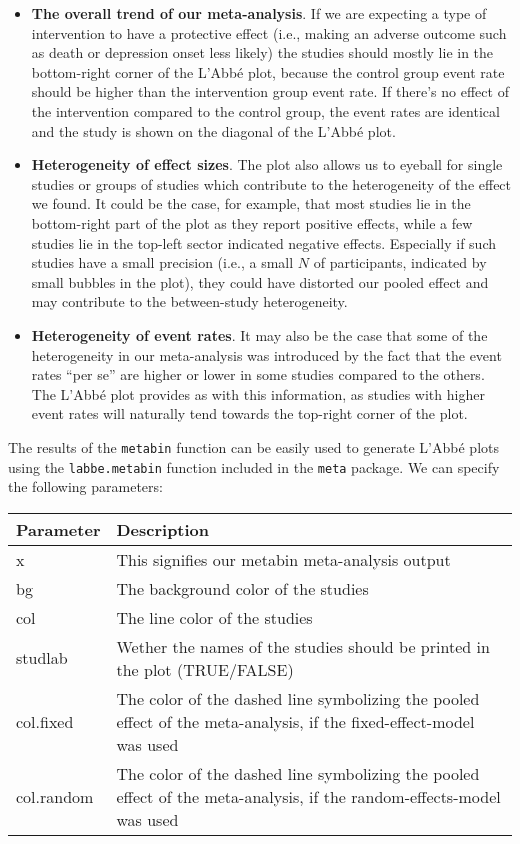 \documentclass[]{book}
\providecommand{\tightlist}{%
  \setlength{\itemsep}{0pt}\setlength{\parskip}{0pt}}
\theoremstyle{definition}
\theoremstyle{definition}
\theoremstyle{definition}
\theoremstyle{remark}
\begin{document}
\begin{itemize}
\tightlist
\item
  \textbf{The overall trend of our meta-analysis}. If we are expecting a
  type of intervention to have a protective effect (i.e., making an
  adverse outcome such as death or depression onset less likely) the
  studies should mostly lie in the bottom-right corner of the L'Abbé
  plot, because the control group event rate should be higher than the
  intervention group event rate. If there's no effect of the
  intervention compared to the control group, the event rates are
  identical and the study is shown on the diagonal of the L'Abbé plot.
\item
  \textbf{Heterogeneity of effect sizes}. The plot also allows us to
  eyeball for single studies or groups of studies which contribute to
  the heterogeneity of the effect we found. It could be the case, for
  example, that most studies lie in the bottom-right part of the plot as
  they report positive effects, while a few studies lie in the top-left
  sector indicated negative effects. Especially if such studies have a
  small precision (i.e., a small \(N\) of participants, indicated by
  small bubbles in the plot), they could have distorted our pooled
  effect and may contribute to the between-study heterogeneity.
\item
  \textbf{Heterogeneity of event rates}. It may also be the case that
  some of the heterogeneity in our meta-analysis was introduced by the
  fact that the event rates ``per se'' are higher or lower in some
  studies compared to the others. The L'Abbé plot provides as with this
  information, as studies with higher event rates will naturally tend
  towards the top-right corner of the plot.
\end{itemize}

The results of the \texttt{metabin} function can be easily used to
generate L'Abbé plots using the \texttt{labbe.metabin} function included
in the \texttt{meta} package. We can specify the following parameters:

\begin{tabular}{l|l}
\hline
Parameter & Description\\
\hline
x & This signifies our metabin meta-analysis output\\
\hline
bg & The background color of the studies\\
\hline
col & The line color of the studies\\
\hline
studlab & Wether the names of the studies should be printed in the plot (TRUE/FALSE)\\
\hline
col.fixed & The color of the dashed line symbolizing the pooled effect of the meta-analysis, if the fixed-effect-model was used\\
\hline
col.random & The color of the dashed line symbolizing the pooled effect of the meta-analysis, if the random-effects-model was used\\
\hline
\end{tabular}
\end{document}
